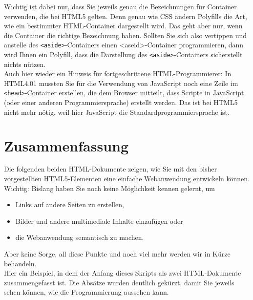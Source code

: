 Wichtig ist dabei nur, dass Sie jeweils genau die Bezeichnungen für Container verwenden, die bei HTML5 gelten. Denn genau wie CSS ändern Polyfills die Art, wie ein bestimmter HTML-Container dargestellt wird. Das geht aber nur, wenn die Container die richtige Bezeichnung haben. Sollten Sie sich also vertippen und anstelle des \verb|<aside>|-Containers einen <aseid>-Container programmieren, dann wird Ihnen ein Polyfill, dass die Darstellung des \verb|<aside>|-Containers sicherstellt nichts nützen.\\

Auch hier wieder ein Hinweis für fortgeschrittene HTML-Programmierer: In HTML4.01 mussten Sie für die Verwendung von JavaScript noch eine Zeile im \verb|<head>|-Container erstellen, die dem Browser mitteilt, dass \glqq{}Scripte\grqq{} in JavaScript (oder einer anderen Programmiersprache) erstellt werden. Das ist bei HTML5 nicht mehr nötig, weil hier JavaScript die Standardprogrammiersprache ist.

\section{Zusammenfassung}

Die folgenden beiden HTML-Dokumente zeigen, wie Sie mit den bisher vorgestellten HTML5-Elementen eine einfache Webanwendung entwickeln können. Wichtig: Bislang haben Sie noch keine Möglichkeit kennen gelernt, um

\begin{itemize}
	\item Links auf andere Seiten zu erstellen,
	\item Bilder und andere multimediale Inhalte einzufügen oder
	\item die Webanwendung semantisch zu machen.
\end{itemize}

Aber keine Sorge, all diese Punkte und noch viel mehr werden wir in Kürze behandeln.\\

Hier ein Beispiel, in dem der Anfang dieses Skripts als zwei HTML-Dokumente zusammengefasst ist. Die Absätze wurden deutlich gekürzt, damit Sie jeweils sehen können, wie die Programmierung aussehen kann.\\

